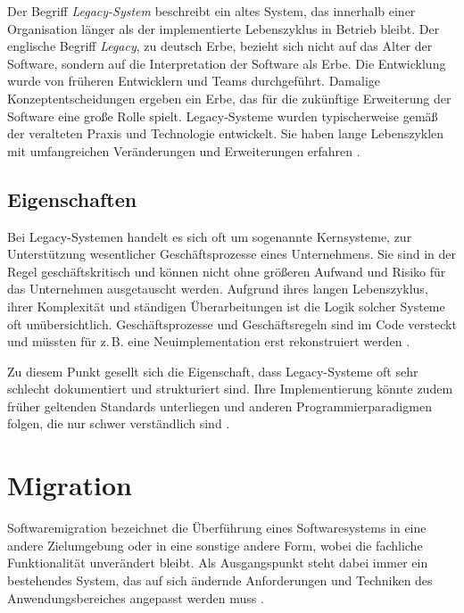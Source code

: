 	Der Begriff \textit{Legacy-System} beschreibt ein altes System, das innerhalb einer Organisation länger als der implementierte Lebenszyklus in Betrieb bleibt. Der englische Begriff \textit{Legacy}, zu deutsch Erbe, bezieht sich nicht auf das Alter der Software, sondern auf die Interpretation der Software als Erbe. Die Entwicklung wurde von früheren Entwicklern und Teams durchgeführt. Damalige Konzeptentscheidungen ergeben ein Erbe, das für die zukünftige Erweiterung der Software eine große Rolle spielt. Legacy-Systeme wurden typischerweise gemäß der veralteten Praxis und Technologie entwickelt. Sie haben lange Lebenszyklen mit umfangreichen Veränderungen und Erweiterungen erfahren \cite{sneed2016softwaremigration}.

\subsection{Eigenschaften}

	Bei Legacy-Systemen handelt es sich oft um sogenannte Kernsysteme, zur Unterstützung wesentlicher Geschäftsprozesse eines Unternehmens. Sie sind in der Regel geschäftskritisch und können nicht ohne größeren Aufwand und Risiko für das Unternehmen ausgetauscht werden. Aufgrund ihres langen Lebenszyklus, ihrer Komplexität und ständigen Überarbeitungen ist die Logik solcher Systeme oft unübersichtlich. Geschäftsprozesse und Geschäftsregeln sind im Code versteckt und müssten für z.\,B. eine Neuimplementation erst rekonstruiert werden \cite{martens2016ablosung}.

	Zu diesem Punkt gesellt sich die Eigenschaft, dass Legacy-Systeme oft sehr schlecht dokumentiert und strukturiert sind. Ihre Implementierung könnte zudem früher geltenden Standards unterliegen und anderen Programmierparadigmen folgen, die nur schwer verständlich sind \cite{stahlknecht2002einfuhrung}.

\section{Migration} \label{ssub:migration}

	Softwaremigration bezeichnet die Überführung eines Softwaresystems in eine andere Zielumgebung oder in eine sonstige andere Form, wobei die fachliche Funktionalität unverändert bleibt. Als Ausgangspunkt steht dabei immer ein bestehendes System, das auf sich ändernde Anforderungen und Techniken des Anwendungsbereiches angepasst werden muss \cite{sneed2016softwaremigration}.

